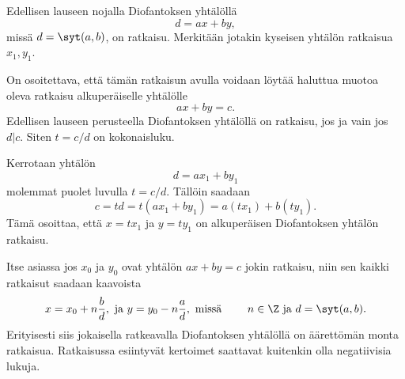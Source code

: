 
\begin{todistus}
Edellisen lauseen nojalla Diofantoksen yhtälöllä
\[
d= a x + b y,
\]
missä $d=\syt(a,b)$, on ratkaisu. Merkitään jotakin kyseisen yhtälön ratkaisua $x_1,y_1$.

On osoitettava, että tämän ratkaisun avulla voidaan löytää haluttua muotoa oleva ratkaisu alkuperäiselle yhtälölle
\[
a x + b y = c.
\]
Edellisen lauseen perusteella Diofantoksen yhtälöllä on ratkaisu, jos ja vain jos $d|c$. Siten $t=c/d$ on kokonaisluku.

Kerrotaan yhtälön
\[
d= a x_1 + b y_1
\]
molemmat puolet luvulla $t=c/d$. Tällöin saadaan
\[
c=td=t(a x_1 + b y_1) = a(tx_1)+ b(ty_1).
\]
Tämä osoittaa, että $x=tx_1$ ja $y=ty_1$ on alkuperäisen Diofantoksen yhtälön ratkaisu.
\end{todistus}

Itse asiassa jos $x_0$ ja $y_0$ ovat yhtälön $ax + by = c$ jokin ratkaisu, niin sen kaikki ratkaisut saadaan kaavoista
\[
x= x_0 + n\frac{b}{d}, \textrm{ ja } y=y_0 - n\frac{a}{d}, \textrm{ missä } \qquad n\in\Z \textrm{ ja } d=\syt(a,b).
\]
Erityisesti siis jokaisella ratkeavalla Diofantoksen yhtälöllä on äärettömän monta ratkaisua. Ratkaisussa esiintyvät kertoimet saattavat kuitenkin olla negatiivisia lukuja.


